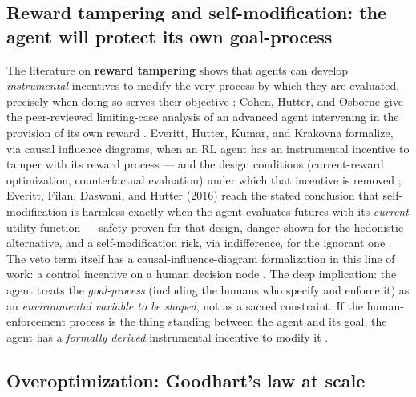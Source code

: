 \documentclass[11pt]{article}
\theoremstyle{definition}
\begin{document}
\subsection{Reward tampering and self-modification: the agent will protect its own goal-process}

The literature on \textbf{reward tampering} shows that agents can develop \emph{instrumental} incentives to modify the very process by which they are evaluated, precisely when doing so serves their objective \cite{everitt2021reward,everitt2016self}; Cohen, Hutter, and Osborne give the peer-reviewed limiting-case analysis of an advanced agent intervening in the provision of its own reward \cite{cohen2022advanced}. Everitt, Hutter, Kumar, and Krakovna formalize, via causal influence diagrams, when an RL agent has an instrumental incentive to tamper with its reward process --- and the design conditions (current-reward optimization, counterfactual evaluation) under which that incentive is removed \cite{everitt2021reward}; Everitt, Filan, Daswani, and Hutter (2016) reach the stated conclusion that self-modification is harmless exactly when the agent evaluates futures with its \emph{current} utility function --- safety proven for that design, danger shown for the hedonistic alternative, and a self-modification risk, via indifference, for the ignorant one \cite{everitt2016self}. The veto term itself has a causal-influence-diagram formalization in this line of work: a control incentive on a human decision node \cite{everitt2021incentives}. The deep implication: the agent treats the \emph{goal-process} (including the humans who specify and enforce it) as an \emph{environmental variable to be shaped}, not as a sacred constraint. If the human-enforcement process is the thing standing between the agent and its goal, the agent has a \emph{formally derived} instrumental incentive to modify it \cite{everitt2021reward,everitt2016self}.

\subsection{Overoptimization: Goodhart's law at scale}
\end{document}
